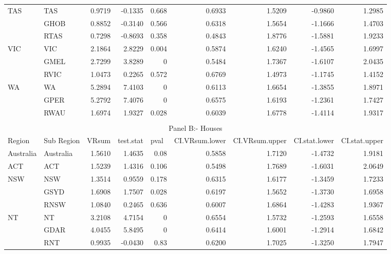 \begin{table}[htbp]
{\begin{tabular}{llrrrrrrr}
    \multirow{3}[0]{*}{TAS} & TAS   & 0.9719 & -0.1335 & 0.668 & 0.6933 & 1.5209 & -0.9860 & 1.2985 \\
          & GHOB  & 0.8852 & -0.3140 & 0.566 & 0.6318 & 1.5654 & -1.1666 & 1.4703 \\
          & RTAS  & 0.7298 & -0.8693 & 0.358 & 0.4843 & 1.8776 & -1.5881 & 1.9233 \\
    \multirow{3}[0]{*}{VIC} & VIC   & 2.1864 & 2.8229 & 0.004 & 0.5874 & 1.6240 & -1.4565 & 1.6997 \\
          & GMEL  & 2.7299 & 3.8289 & 0     & 0.5484 & 1.7367 & -1.6107 & 2.0435 \\
          & RVIC  & 1.0473 & 0.2265 & 0.572 & 0.6769 & 1.4973 & -1.1745 & 1.4152 \\
    \multirow{3}[1]{*}{WA} & WA    & 5.2894 & 7.4103 & 0     & 0.6113 & 1.6654 & -1.3855 & 1.8971 \\
          & GPER  & 5.2792 & 7.4076 & 0     & 0.6575 & 1.6193 & -1.2361 & 1.7427 \\
          & RWAU  & 1.6974 & 1.9327 & 0.028 & 0.6039 & 1.6778 & -1.4114 & 1.9317 \\
    \midrule \\
    \multicolumn{9}{c}{Panel B:- Houses} \\
    \midrule
    Region & Sub Region & \multicolumn{1}{l}{VRsum} & \multicolumn{1}{l}{test.stat} & \multicolumn{1}{l}{pval} & \multicolumn{1}{l}{CI.VRsum.lower} & \multicolumn{1}{l}{CI.VRsum.upper} & \multicolumn{1}{l}{CI.stat.lower} & \multicolumn{1}{l}{CI.stat.upper} \\
    \midrule
    Australia & Australia & 1.5610 & 1.4635 & 0.08  & 0.5858 & 1.7120 & -1.4732 & 1.9181 \\
    ACT   & ACT   & 1.5239 & 1.4316 & 0.106 & 0.5498 & 1.7689 & -1.6031 & 2.0649 \\
    \multirow{3}[0]{*}{NSW} & NSW   & 1.3514 & 0.9559 & 0.178 & 0.6315 & 1.6177 & -1.3459 & 1.7233 \\
          & GSYD  & 1.6908 & 1.7507 & 0.028 & 0.6197 & 1.5652 & -1.3730 & 1.6958 \\
          & RNSW  & 1.0840 & 0.2465 & 0.636 & 0.6007 & 1.6864 & -1.4283 & 1.9367 \\
    \multirow{3}[0]{*}{NT} & NT    & 3.2108 & 4.7154 & 0     & 0.6554 & 1.5732 & -1.2593 & 1.6558 \\
          & GDAR  & 4.0455 & 5.8495 & 0     & 0.6414 & 1.6001 & -1.2914 & 1.6842 \\
          & RNT   & 0.9935 & -0.0430 & 0.83  & 0.6200 & 1.7025 & -1.3250 & 1.7947 \\

\end{tabular}}
\end{table}
